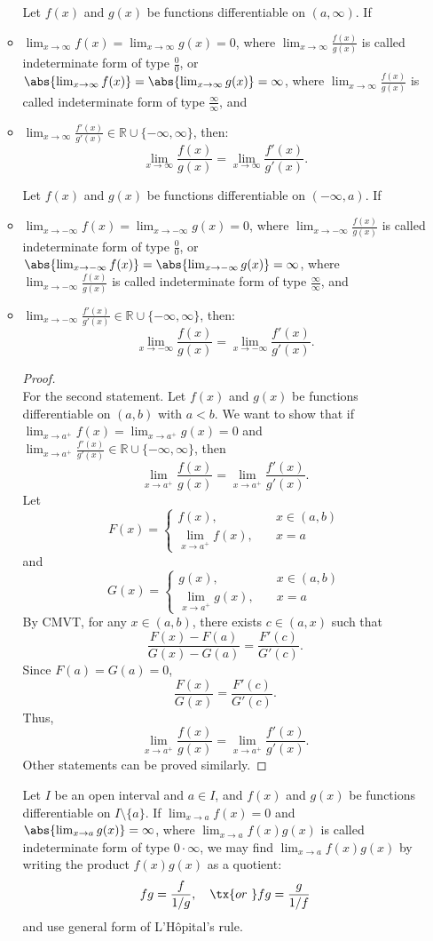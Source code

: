 \documentclass[a4paper,12pt]{report}
\begin{document}
\begin{itemize}
\begin{itemize}
Let $f(x)$ and $g(x)$ be functions differentiable on $(a,\infty)$. If
\bit
\item $\lim_{x\to\infty}f(x)=\lim_{x\to\infty}g(x)=0$, where $\lim_{x\to\infty}\frac{f(x)}{g(x)}$ is called indeterminate form of type $\frac{0}{0}$, or $\abs{\lim_{x\to\infty}f(x)}=\abs{\lim_{x\to\infty}g(x)}=\infty$, where $\lim_{x\to\infty}\frac{f(x)}{g(x)}$ is called indeterminate form of type $\frac{\infty}{\infty}$, and
\item $\lim_{x\to\infty}\frac{f'(x)}{g'(x)}\in\mathbb{R}\cup\{-\infty,\infty\}$,
\eit
then:
\[\lim_{x\to\infty}\frac{f(x)}{g(x)}=\lim_{x\to\infty}\frac{f'(x)}{g'(x)}.\]

Let $f(x)$ and $g(x)$ be functions differentiable on $(-\infty,a)$. If
\bit
\item $\lim_{x\to -\infty}f(x)=\lim_{x\to -\infty}g(x)=0$, where $\lim_{x\to -\infty}\frac{f(x)}{g(x)}$ is called indeterminate form of type $\frac{0}{0}$, or $\abs{\lim_{x\to -\infty}f(x)}=\abs{\lim_{x\to -\infty}g(x)}=\infty$, where $\lim_{x\to -\infty}\frac{f(x)}{g(x)}$ is called indeterminate form of type $\frac{\infty}{\infty}$, and
\item $\lim_{x\to -\infty}\frac{f'(x)}{g'(x)}\in\mathbb{R}\cup\{-\infty,\infty\}$,
\eit
then:
\[\lim_{x\to -\infty}\frac{f(x)}{g(x)}=\lim_{x\to -\infty}\frac{f'(x)}{g'(x)}.\]
\begin{proof}\mbox{}\\
For the second statement. Let $f(x)$ and $g(x)$ be functions differentiable on $(a,b)$ with $a<b$. We want to show that if $\lim_{x\to a^+}f(x)=\lim_{x\to a^+}g(x)=0$ and $\lim_{x\to a^+}\frac{f'(x)}{g'(x)}\in\mathbb{R}\cup\{-\infty,\infty\}$, then
\[\lim_{x\to a^+}\frac{f(x)}{g(x)}=\lim_{x\to a^+}\frac{f'(x)}{g'(x)}.\]
Let
\[F(x)=\begin{cases}f(x),\quad & x\in (a,b)\\
\lim_{x\to a^+}f(x),\quad & x=a\end{cases}\]
and
\[G(x)=\begin{cases}g(x),\quad & x\in (a,b)\\
\lim_{x\to a^+}g(x),\quad & x=a\end{cases}\]
By CMVT, for any $x\in (a,b)$, there exists $c\in (a,x)$ such that
\[\frac{F(x)-F(a)}{G(x)-G(a)}=\frac{F'(c)}{G'(c)}.\]
Since $F(a)=G(a)=0$,
\[\frac{F(x)}{G(x)}=\frac{F'(c)}{G'(c)}.\]
Thus,
\[\lim_{x\to a^+}\frac{f(x)}{g(x)}=\lim_{x\to a^+}\frac{f'(x)}{g'(x)}.\]
Other statements can be proved similarly.
\end{proof}
Let $I$ be an open interval and $a\in I$, and $f(x)$ and $g(x)$ be functions differentiable on $I\setminus\{a\}$. If $\lim_{x\to a}f(x)=0$ and $\abs{\lim_{x\to a}g(x)}=\infty$, where $\lim_{x\to a}f(x)g(x)$ is called indeterminate form of type $0\cdot\infty$, we may find $\lim_{x\to a}f(x)g(x)$ by writing the product $f(x)g(x)$ as a quotient:
\[fg=\frac{f}{1/g},\quad\tx{or\ }fg=\frac{g}{1/f}\]
and use general form of L'Hôpital's rule.


\end{itemize}
\end{itemize}
\end{document}
